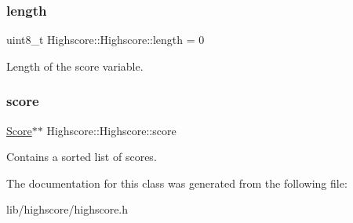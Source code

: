 \subsubsection{\texorpdfstring{length}{length}}
{\footnotesize\ttfamily uint8\+\_\+t Highscore\+::\+Highscore\+::length = 0\hspace{0.3cm}{\ttfamily [private]}}

Length of the score variable. \hypertarget{class_highscore_1_1_highscore_a569a403dc24a8fa67efd7065148f4c9d}{}\label{class_highscore_1_1_highscore_a569a403dc24a8fa67efd7065148f4c9d} 
\subsubsection{\texorpdfstring{score}{score}}
{\footnotesize\ttfamily \hyperlink{struct_highscore_1_1_score}{Score}$\ast$$\ast$ Highscore\+::\+Highscore\+::score\hspace{0.3cm}{\ttfamily [private]}}

Contains a sorted list of scores. 

The documentation for this class was generated from the following file\+:\begin{DoxyCompactItemize}
\item 
lib/highscore/highscore.\+h\end{DoxyCompactItemize}
